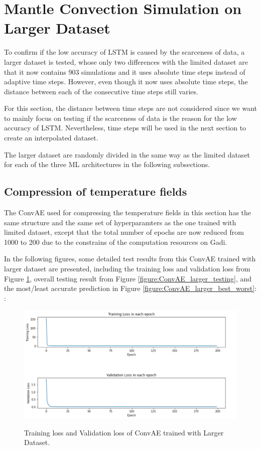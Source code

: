 \section{Mantle Convection Simulation on Larger Dataset}

To confirm if the low accuracy of LSTM is caused by the scarceness of data, a larger dataset is tested, whose only two differences with the limited dataset are that it now contains 903 simulations and it uses absolute time steps instead of adaptive time steps. However, even though it now uses absolute time steps, the distance between each of the consecutive time steps still varies.

For this section, the distance between time steps are not considered since we want to mainly focus on testing if the scarceness of data is the reason for the low accuracy of LSTM. Nevertheless, time steps will be used in the next section to create an interpolated dataset.

The larger dataset are randomly divided in the same way as the limited dataset for each of the three ML architectures in the following subsections.

\subsection{Compression of temperature fields}

The ConvAE used for compressing the temperature fields in this section has the same structure and the same set of hyperparamters as the one trained with limited dataset, except that the total number of epochs are now reduced from 1000 to 200 due to the constrains of the computation resources on Gadi.

In the following figures, some detailed test results from this ConvAE trained with larger dataset are presented, including the training loss and validation loss from Figure \ref{figure:ConvAE_larger_losses}, overall testing result from Figure \ref{figure:ConvAE_larger_testing}, and the most/least accurate prediction in Figure \ref{figure:ConvAE_larger_best_worst}:
:

\begin{figure}[H]
    \caption{Training loss and Validation loss of ConvAE trained with Larger Dataset.}
    \includegraphics[scale=0.6]{figures/mantle_convection_images/larger_dataset/ConvAE_trainingData.png}
    \label{figure:ConvAE_larger_losses}
\end{figure}

